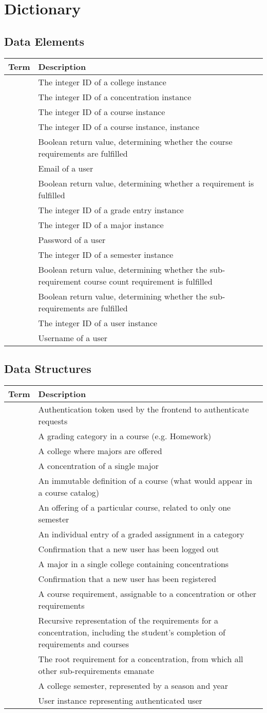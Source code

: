 \documentclass[12pt]{article}
\newenvironment{dictionary}[1]
{
    \subsection{#1}
    \begin{table}[H]
    \begin{tabular}{ | m{\dimexpr.45\linewidth-1\tabcolsep-1.3333\arrayrulewidth}
                     | m{\dimexpr.55\linewidth-1\tabcolsep-1.3333\arrayrulewidth} | }
    \hline
    \textbf{Term} & \textbf{Description} \\ \hline
}
{
    \end{tabular}
    \end{table}
}
\newcommand{\dictitem}[2]{\detokenize{#1} & #2 \\ \hline}
\begin{document}
\section{Dictionary}
\begin{dictionary}{Data Elements}
    \dictitem{college_id}{The integer ID of a college instance}
    \dictitem{concentration_id}{The integer ID of a concentration instance}
    \dictitem{course_id}{The integer ID of a course instance}
    \dictitem{course_instance_id}{The integer ID of a course instance, instance}
    \dictitem{course_requirement_result}{Boolean return value, determining whether the course
    requirements are fulfilled}
    \dictitem{email}{Email of a user}
    \dictitem{fulfillment_status/fulfillment_result}{Boolean return value, determining whether a
    requirement is fulfilled}
    \dictitem{grade_entry_id}{The integer ID of a grade entry instance}
    \dictitem{major_id}{The integer ID of a major instance}
    \dictitem{password}{Password of a user}
    \dictitem{semester_id}{The integer ID of a semester instance}
    \dictitem{sub_requirement_course_count_result}{Boolean return value, determining whether the
    sub-requirement course count requirement is fulfilled}
    \dictitem{sub_requirement_result}{Boolean return value, determining whether the
    sub-requirements are fulfilled}
    \dictitem{user_id}{The integer ID of a user instance}
    \dictitem{username}{Username of a user}
\end{dictionary}

\begin{dictionary}{Data Structures}
    \dictitem{auth_token}{Authentication token used by the frontend to authenticate requests}
    \dictitem{category}{A grading category in a course (e.g. Homework)}
    \dictitem{college}{A college where majors are offered}
    \dictitem{concentration}{A concentration of a single major}
    \dictitem{course}{An immutable definition of a course (what would appear in a course catalog)}
    \dictitem{course_instance}{An offering of a particular course, related to only one semester}
    \dictitem{grade_entry}{An individual entry of a graded assignment in a category}
    \dictitem{logout_confirmation}{Confirmation that a new user has been logged out}
    \dictitem{major}{A major in a single college containing concentrations}
    \dictitem{registration_confirmation}{Confirmation that a new user has been registered}
    \dictitem{requirement}{A course requirement, assignable to a concentration or other
    requirements}
    \dictitem{requirement_structure}{Recursive representation of the requirements for a
    concentration, including the student's completion of requirements and courses}
    \dictitem{root_requirement}{The root requirement for a concentration, from which all other
    sub-requirements emanate}
    \dictitem{semester}{A college semester, represented by a season and year}
    \dictitem{user}{User instance representing authenticated user}
\end{dictionary}
\end{document}
